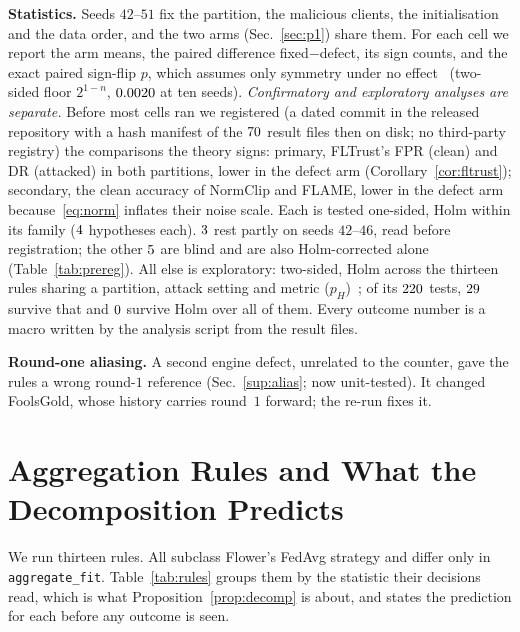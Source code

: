 \documentclass[journal]{IEEEtran}
\begin{document}
\textbf{Statistics.} Seeds $42$--$51$ fix the partition, the malicious clients,
the initialisation and the data order, and the two arms (Sec.~\ref{sec:p1}) share
them. For each cell we report the arm means, the paired difference
fixed$-$defect, its sign counts, and the exact paired sign-flip $p$, which assumes only symmetry under no
effect~\cite{ernst2004permutation} (two-sided floor $2^{1-n}$, $0.0020$ at
ten seeds).
\emph{Confirmatory and exploratory analyses are separate.} Before most cells ran we
registered (a dated commit in the released repository with a hash manifest of the
$70$ result files then on disk; no third-party registry) the comparisons the theory signs: primary,
FLTrust's FPR (clean) and DR (attacked) in both partitions, lower in the defect arm
(Corollary~\ref{cor:fltrust}); secondary, the clean accuracy of NormClip and FLAME,
lower in the defect arm because~\eqref{eq:norm} inflates their noise scale. Each is
tested one-sided, Holm within its family ($4$ hypotheses each). $3$ rest partly on seeds $42$--$46$, read before registration;
the other $5$ are blind and are also Holm-corrected alone
(Table~\ref{tab:prereg}). All else is exploratory: two-sided, Holm across
the thirteen rules sharing a partition, attack setting and metric ($p_H$)~\cite{holm1979};
of its $220$ tests, $29$ survive that and
$0$ survive Holm over all of them.
Every outcome number is a macro written by the analysis script from the result files.

\textbf{Round-one aliasing.} A second engine defect, unrelated to the counter, gave
the rules a wrong round-$1$ reference (Sec.~\ref{sup:alias}; now unit-tested). It
changed FoolsGold, whose history carries round~$1$ forward; the re-run fixes it.


\section{Aggregation Rules and What the Decomposition Predicts}
\label{sec:rules}

We run thirteen rules. All subclass Flower's FedAvg strategy and differ only in
\texttt{aggregate\_fit}. Table~\ref{tab:rules} groups them by the statistic their
decisions read, which is what Proposition~\ref{prop:decomp} is about, and states
the prediction for each before any outcome is seen.
\end{document}
